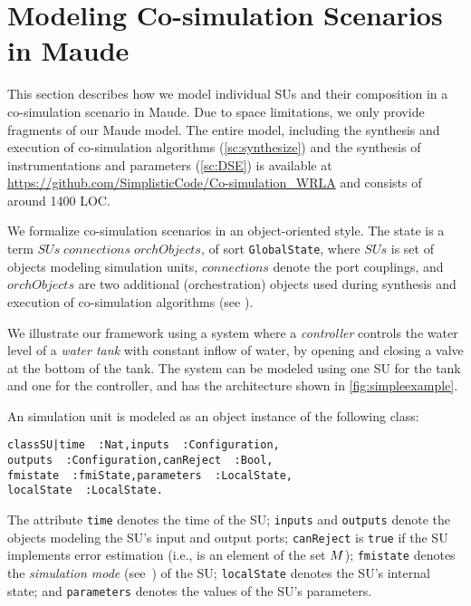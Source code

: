 
\section{Modeling Co-simulation Scenarios in Maude}
\label{sec:model}

This section describes how we model  individual SUs and their
composition in a co-simulation scenario in Maude.
%
Due to space limitations, we only provide fragments of our Maude
model. 
The entire model, including the synthesis and execution of co-simulation
algorithms (\cref{sc:synthesize}) and the synthesis of
instrumentations and parameters (\cref{sc:DSE})  is
available at \url{https://github.com/SimplisticCode/Co-simulation_WRLA} and consists of around 
1400 LOC. 

We formalize  co-simulation scenarios in an object-oriented style. The
 state is a term
 \texttt{}$\mathit{SUs}\;\mathit{connections}\;\mathit{orchObjects}$\texttt{}, 
 of sort \texttt{GlobalState}, 
 where $\mathit{SUs}$ is set of objects modeling simulation units,
$\mathit{connections}$ denote the port couplings, and
$\mathit{orchObjects}$ are two additional (orchestration) objects used
during synthesis and execution of co-simulation algorithms (see
). 

We illustrate our  framework using a system where a
\emph{controller} 
controls the water level of a \emph{water tank} with constant inflow
of water,  by opening and closing a valve
at the bottom of the tank. 
The system can be modeled using  one SU for the tank and one for
the controller, and has the architecture shown in
\cref{fig:simpleexample}.

An simulation unit  is modeled as an object instance of the following
class: %
\small
\begin{alltt}
class SU | time\,\,: Nat,                inputs\,\,: Configuration,
           outputs\,\,: Configuration,   canReject\,\,: Bool,
           fmistate\,\,: fmiState,       parameters\,\,: LocalState,
           localState\,\,: LocalState .
\end{alltt}
\normalsize

\noindent The attribute \texttt{time} denotes the time of the SU; 
\texttt{inputs} and \texttt{outputs} denote the objects modeling the
SU's input and output 
ports; \texttt{canReject}  is \texttt{true} if  the SU
implements error estimation (i.e., is an element of the set
$M$);  
\texttt{fmistate} denotes the \emph{simulation mode}
(see~\cite{FMI2014}) of the SU; \texttt{localState} denotes the SU's internal
state; and \texttt{parameters} denotes the values of the SU's
parameters. 

